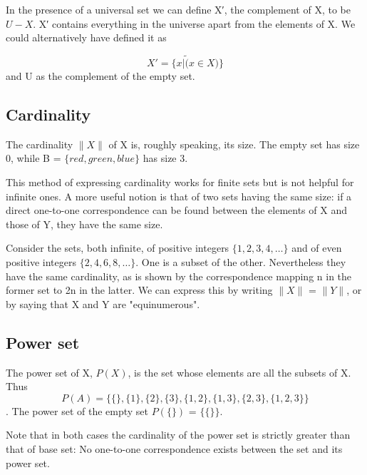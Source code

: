\documentclass[12pt]{article}
\begin{document}
In the presence of a universal set we can define X′, the complement of X, to be $U−X$. X′ contains everything in the universe apart from the elements of X. We could alternatively have defined it as

\[X′ = \{x | \tilde (x\in X)\}\]
and U as the complement of the empty set.

\subsection{Cardinality}

The cardinality $\|X\|$ of X is, roughly speaking, its size. The empty set has size 0, while B = $\{red, green, blue\}$ has size 3. 

This method of expressing cardinality works for finite sets but is not helpful for infinite ones. A more useful notion is that of two sets having the same size: if a direct one-to-one correspondence can be found between the elements of X and those of Y, they have the same size. 

Consider the sets, both infinite, of positive integers $\{1,2,3,4, \ldots\}$ and of even positive integers $\{2,4,6,8, \ldots\}$. One is a subset of the other. Nevertheless they have the same cardinality, as is shown by the correspondence mapping n in the former set to 2n in the latter. We can express this by writing $\|X\|$ = $\|Y\|$, or by saying that X and Y are "equinumerous".

\subsection{Power set}

The power set of X, $P(X)$, is the set whose elements are all the subsets of X. Thus \[P(A) = \{ \{\}, \{1\}, \{2\}, \{3\}, \{1,2\}, \{1,3\}, \{2,3\}, \{1,2,3\}\}\]. The power set of the empty set $P(\{\})$ = $\{\{\}\}$. 

Note that in both cases the cardinality of the power set is strictly greater than that of base set: No one-to-one correspondence exists between the set and its power set. 

\end{document}
